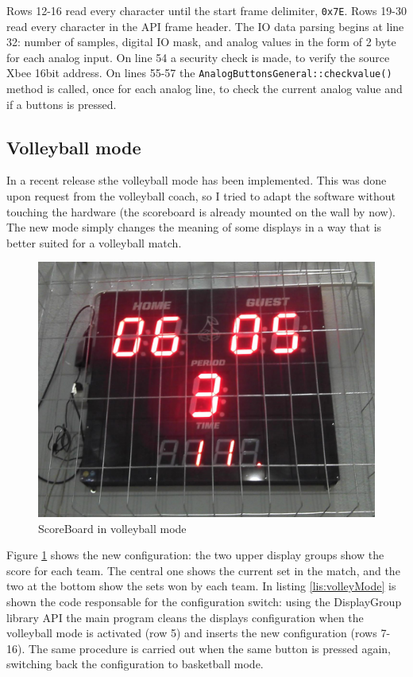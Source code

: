 \documentclass[11pt,english]{article}
\newcommand{\code}[1]{\texttt{#1}}
\begin{document}
Rows 12-16 read every character until the start frame delimiter, \code{0x7E}.
Rows 19-30 read every character in the API frame header. The IO data parsing begins at line 32: number of samples,
digital IO mask, and analog values in the form of 2 byte for each analog input.
On line 54 a security check is made, to verify the source Xbee 16bit address.
On lines 55-57 the \code{AnalogButtonsGeneral::checkvalue()} method is called, once for 
each analog line, to check the current analog value and if a buttons is pressed.


\subsection{Volleyball mode}

In a recent release sthe volleyball mode has been implemented. This was done upon request from the volleyball 
coach, so I tried to adapt the software without touching the hardware (the scoreboard is already mounted on the wall 
by now). The new mode simply changes the meaning of some displays in a way that is better suited for a volleyball 
match.
%
\begin{figure}[htb]
\centering\includegraphics[scale=0.32]{img/Scoreboard_volley}

\caption{ScoreBoard in volleyball mode \label{fig:volleyball-mode}}

\end{figure}

Figure \ref{fig:volleyball-mode} shows the new configuration: the two upper display groups show the score for each team.
The central one shows the current set in the match, and the two at the bottom show the sets won by each team.
In listing \ref{lis:volleyMode} is shown the code responsable for the configuration switch: using the DisplayGroup 
library API the main program cleans the displays configuration when the volleyball mode is activated (row 5) and 
inserts the new configuration (rows 7-16). The same procedure is carried out when the same button is pressed again,
switching back the configuration to basketball mode.
\end{document}
